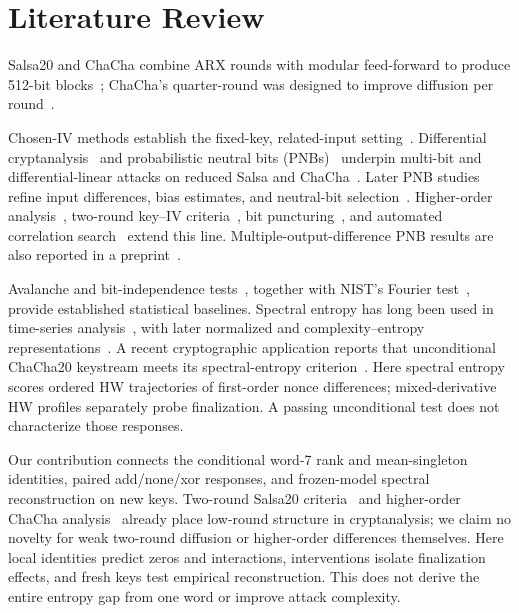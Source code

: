 \section{Literature Review}\label{sec:literature}\label{sec:related}

Salsa20 and ChaCha combine ARX rounds with modular feed-forward to produce 512-bit blocks~\citep{bernstein2008salsa,estream2008,nir2018}; ChaCha's quarter-round was designed to improve diffusion per round~\citep{bernstein2008chacha}.

Chosen-IV methods establish the fixed-key, related-input setting~\citep{englund2007,fischer2008,maitra2016}. Differential cryptanalysis~\citep{biham1991} and probabilistic neutral bits (PNBs)~\citep{aumasson2008} underpin multi-bit and differential-linear attacks on reduced Salsa and ChaCha~\citep{choudhuri2016,dey2017,beierle2020,coutinho2023}. Later PNB studies refine input differences, bias estimates, and neutral-bit selection~\citep{ghafoori2023,dey2024salsa,dey2024tit}. Higher-order analysis~\citep{ghafoori2024hodl}, two-round key--IV criteria~\citep{dey2025tosc}, bit puncturing~\citep{florez2025}, and automated correlation search~\citep{liu2026} extend this line. Multiple-output-difference PNB results are also reported in a preprint~\citep{paul2025}.

Avalanche and bit-independence tests~\citep{webster1986,hernandez2005,madarro2024}, together with NIST's Fourier test~\citep{nist2010}, provide established statistical baselines. Spectral entropy has long been used in time-series analysis~\citep{powell1979,inouye1991}, with later normalized and complexity--entropy representations~\citep{zaccarelli2013,dai2018,mao2018}. A recent cryptographic application reports that unconditional ChaCha20 keystream meets its spectral-entropy criterion~\citep{kasyanov2026}. Here spectral entropy scores ordered HW trajectories of first-order nonce differences; mixed-derivative HW profiles separately probe finalization. A passing unconditional test does not characterize those responses.

Our contribution connects the conditional word-7 rank and mean-singleton identities, paired add/none/xor responses, and frozen-model spectral reconstruction on new keys. Two-round Salsa20 criteria~\citep{dey2025tosc} and higher-order ChaCha analysis~\citep{ghafoori2024hodl} already place low-round structure in cryptanalysis; we claim no novelty for weak two-round diffusion or higher-order differences themselves. Here local identities predict zeros and interactions, interventions isolate finalization effects, and fresh keys test empirical reconstruction. This does not derive the entire entropy gap from one word or improve attack complexity.
